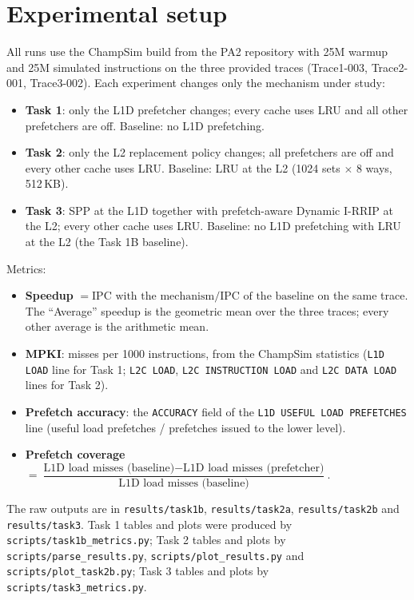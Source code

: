 \documentclass[11pt]{article}
\begin{document}
\section*{Experimental setup}
All runs use the ChampSim build from the PA2 repository with 25M warmup and 25M
simulated instructions on the three provided traces (Trace1-003, Trace2-001,
Trace3-002). Each experiment changes only the mechanism under study:
\begin{itemize}
  \item \textbf{Task 1}: only the L1D prefetcher changes; every cache uses LRU
        and all other prefetchers are off. Baseline: no L1D prefetching.
  \item \textbf{Task 2}: only the L2 replacement policy changes; all
        prefetchers are off and every other cache uses LRU. Baseline: LRU at the
        L2 (1024 sets $\times$ 8 ways, 512\,KB).
  \item \textbf{Task 3}: SPP at the L1D together with prefetch-aware Dynamic
        I-RRIP at the L2; every other cache uses LRU. Baseline: no L1D
        prefetching with LRU at the L2 (the Task 1B baseline).
\end{itemize}
Metrics:
\begin{itemize}
  \item \textbf{Speedup} $= \text{IPC with the mechanism} / \text{IPC of the baseline}$
        on the same trace. The ``Average'' speedup is the geometric mean over
        the three traces; every other average is the arithmetic mean.
  \item \textbf{MPKI}: misses per 1000 instructions, from the ChampSim
        statistics (\texttt{L1D LOAD} line for Task 1; \texttt{L2C LOAD},
        \texttt{L2C INSTRUCTION LOAD} and \texttt{L2C DATA LOAD} lines for
        Task 2).
  \item \textbf{Prefetch accuracy}: the \texttt{ACCURACY} field of the
        \texttt{L1D USEFUL LOAD PREFETCHES} line
        (useful load prefetches / prefetches issued to the lower level).
  \item \textbf{Prefetch coverage}
        $= \dfrac{\text{L1D load misses (baseline)} - \text{L1D load misses (prefetcher)}}
                 {\text{L1D load misses (baseline)}}$.
\end{itemize}
The raw outputs are in \texttt{results/task1b}, \texttt{results/task2a},
\texttt{results/task2b} and \texttt{results/task3}. Task 1 tables and plots were produced by
\texttt{scripts/task1b\_metrics.py}; Task 2 tables and plots by
\texttt{scripts/parse\_results.py}, \texttt{scripts/plot\_results.py} and
\texttt{scripts/plot\_task2b.py}; Task 3 tables and plots by
\texttt{scripts/task3\_metrics.py}.
\end{document}
